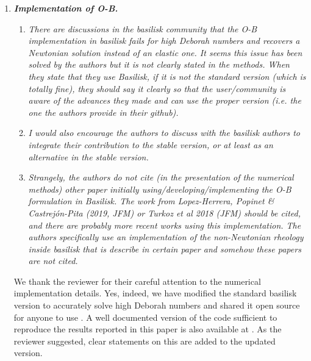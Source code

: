 \documentclass[]{article}
\newcommand{\vsy}[1]{\todo[color=orange, bordercolor=none, textcolor=white]{Vatsal}\textcolor{orange}{#1}}
\begin{document}
\begin{enumerate}
\begin{enumerate}

    \end{enumerate}

     \item  \textbf{\textit{Implementation of O-B.}}
      \begin{enumerate}
          \item \textit{There are discussions in the basilisk community that the O-B implementation in basilisk fails for high Deborah numbers and recovers a Newtonian solution instead of an elastic one. It seems this issue has been solved by the authors but it is not clearly stated in the methods. When they state that they use Basilisk, if it is not the standard version (which is totally fine), they should say it clearly so that the user/community is aware of the advances they made and can use the proper version (i.e. the one the authors provide in their github).}

          \item \textit{I would also encourage the authors to discuss with the basilisk authors to integrate their contribution to the stable version, or at least as an alternative in the stable version.}

          \item \textit{Strangely, the authors do not cite (in the presentation of the numerical methods) other paper initially using/developing/implementing the O-B formulation in Basilisk. The work from Lopez-Herrera, Popinet \& Castrejón-Pita (2019, JFM) or Turkoz et al 2018 (JFM) should be cited, and there are probably more recent works using this implementation. The authors specifically use an implementation of the non-Newtonian rheology inside basilisk that is describe in certain paper and somehow these papers are not cited.}
      \end{enumerate}

      We thank the reviewer for their careful attention to the numerical implementation details.
      Yes, indeed, we have modified the standard basilisk version to accurately solve high Deborah numbers and shared it open source for anyone to use \citep{vatsalElastoFlow2024}. A well documented version of the code sufficient to reproduce the results reported in this paper is also available at \citet{Sanjay2024code}.
      As the reviewer suggested, clear statements on this are added to the updated version.


\end{enumerate}
\end{document}
